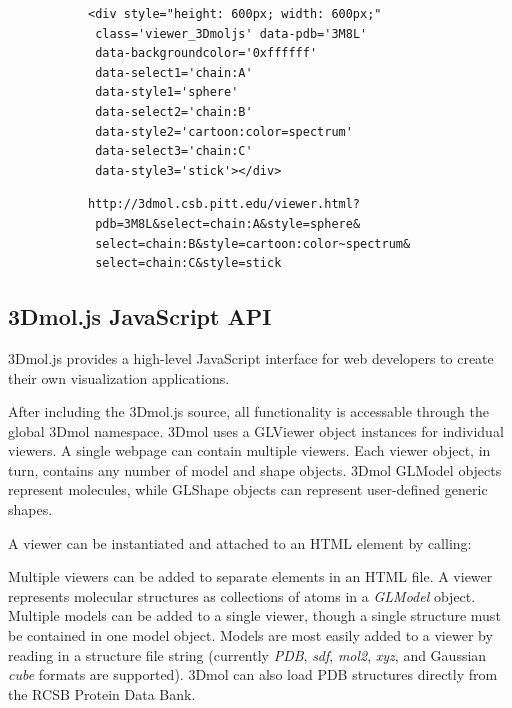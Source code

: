 \documentclass[]{bioinfo}
\begin{document}
\begin{figure}
\begin{minipage}[b]{\linewidth}
\begin{subfigure}[b]{\linewidth} \centering
\begin{verbatim}
<div style="height: 600px; width: 600px;" 
 class='viewer_3Dmoljs' data-pdb='3M8L'
 data-backgroundcolor='0xffffff'  
 data-select1='chain:A'
 data-style1='sphere'
 data-select2='chain:B'
 data-style2='cartoon:color=spectrum'
 data-select3='chain:C'
 data-style3='stick'></div>
\end{verbatim}
\caption{}\label{embed}
\end{subfigure}

\begin{subfigure}[b]{\linewidth} \centering
\begin{verbatim}
http://3dmol.csb.pitt.edu/viewer.html?
 pdb=3M8L&select=chain:A&style=sphere&
 select=chain:B&style=cartoon:color~spectrum&
 select=chain:C&style=stick
\end{verbatim}
\caption{}\label{url}
\end{subfigure}
\end{minipage}

\end{figure}

\subsection{3Dmol.js JavaScript API}
3Dmol.js provides a high-level JavaScript interface for web developers to create their own visualization applications. 

After including the 3Dmol.js source, all functionality is accessable through the global 3Dmol namespace. 3Dmol uses a GLViewer object instances for individual viewers.  A single webpage can contain multiple viewers.  Each viewer object, in turn, contains any number of model and shape objects.  3Dmol GLModel objects represent molecules, while GLShape objects can represent user-defined generic shapes.

A viewer can be instantiated and attached to an HTML element by calling:


Multiple viewers can be added to separate elements in an HTML file.  A viewer represents molecular structures as collections of atoms in a \emph{GLModel} object.  Multiple models can be added to a single viewer, though a single structure must be contained in one model object.  Models are most easily added to a viewer by reading in a structure file string (currently \emph{PDB}, \emph{sdf}, \emph{mol2}, \emph{xyz}, and Gaussian \emph{cube} formats are supported).  3Dmol can also load PDB structures directly from the RCSB Protein Data Bank.
\end{document}
